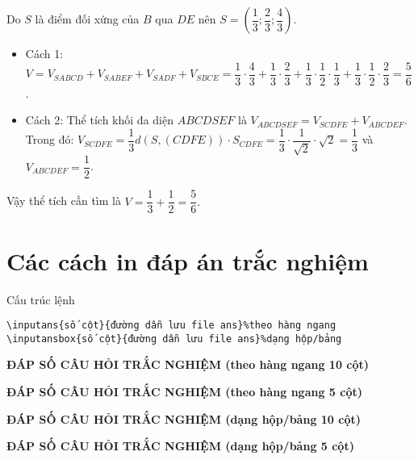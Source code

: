 \documentclass[12pt,a4paper,oneside]{article}
\begin{document}
\begin{ex}
{		Do $ S $ là điểm đối xứng của $ B $ qua $ DE $ nên $ S =  \left(\dfrac{1}{3}; \dfrac{2}{3}; \dfrac{4}{3}\right) $.
		\begin{itemize}
			\item 		Cách 1: $ V = V_{SABCD} + V_{SABEF} + V_{SADF}+V_{SBCE}= \dfrac{1}{3} \cdot \dfrac{4}{3} + \dfrac{1}{3} \cdot \dfrac{2}{3} + \dfrac{1}{3} \cdot \dfrac{1}{2} \cdot \dfrac{1}{3} + \dfrac{1}{3} \cdot \dfrac{1}{2} \cdot \dfrac{2}{3} = \dfrac{5}{6} $.
			\item Cách 2: Thể tích khối đa diện $ ABCDSEF  $ là $ V_{ABCDSEF} = V_{SCDFE} + V_{ABCDEF}.$\\
			Trong đó: 
			$V_{SCDFE} = \dfrac{1}{3} d\left(S,(CDFE)\right) \cdot S_{CDFE} = \dfrac{1}{3} \cdot \dfrac{1}{\sqrt{2}} \cdot \sqrt{2} = \dfrac{1}{3} $ và $ V_{ABCDEF} = \dfrac{1}{2} $.
		\end{itemize}
		Vậy thể tích cần tìm là $ V = \dfrac{1}{3} + \dfrac{1}{2} = \dfrac{5}{6}.$ 
	}
\end{ex}	
\section{Các cách in đáp án trắc nghiệm}
Cấu trúc lệnh
\begin{verbatim}
\inputans{số cột}{đường dẫn lưu file ans}%theo hàng ngang
\inputansbox{số cột}{đường dẫn lưu file ans}%dạng hộp/bảng
\end{verbatim}
\begin{center}
\textbf{ĐÁP SỐ CÂU HỎI TRẮC NGHIỆM (theo hàng ngang 10 cột)}
\end{center}
\begin{center}
\textbf{ĐÁP SỐ CÂU HỎI TRẮC NGHIỆM (theo hàng ngang 5 cột)}
\end{center}
\begin{center}
\textbf{ĐÁP SỐ CÂU HỎI TRẮC NGHIỆM (dạng hộp/bảng 10 cột)}
\end{center}
\begin{center}
\textbf{ĐÁP SỐ CÂU HỎI TRẮC NGHIỆM (dạng hộp/bảng 5 cột)}
\end{center}
\end{document}
